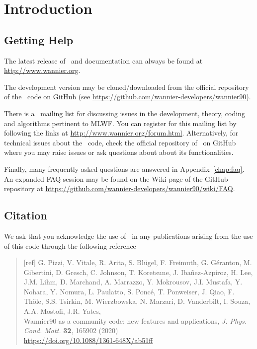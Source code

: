 \chapter*{Introduction}
\section*{Getting Help}
The latest release of \wannier\ and documentation can always
be found at \url{http://www.wannier.org}.

The development version may be cloned/downloaded from the
official repository of the \wannier\ code on GitHub 
(see \url{https://github.com/wannier-developers/wannier90}).

There is a \wannier\ mailing list for discussing issues in the
development, theory, coding and algorithms pertinent to MLWF.
You can register for this mailing list by following the links at
\url{http://www.wannier.org/forum.html}.
Alternatively, for technical issues about the \wannier\ code, 
check the official repository of \wannier\ on GitHub 
where you may raise issues or ask questions about about its
functionalities.

Finally, many frequently asked questions are answered in
Appendix~\ref{chap:faq}. An expanded FAQ session may be
found on the Wiki page of the GitHub repository at 
\url{https://github.com/wannier-developers/wannier90/wiki/FAQ}. 

\section*{Citation}
We ask that you acknowledge the use of \wannier\ in any publications
arising from the use of this code through the following reference
\begin{quote}
  [ref] G. Pizzi, V. Vitale, R. Arita, S. Bl\"ugel, F. Freimuth, G. G\'eranton, 
  M. Gibertini, D. Gresch, C. Johnson, T. Koretsune, J. Iba\~nez-Azpiroz, 
  H. Lee, J.M. Lihm, D. Marchand, A. Marrazzo, Y. Mokrousov, J.I. Mustafa, 
  Y. Nohara, Y. Nomura, L. Paulatto, S. Ponc\'e, T. Ponweiser, J. Qiao, 
  F. Th\"ole, S.S. Tsirkin, M. Wierzbowska, N. Marzari, D. Vanderbilt, 
  I. Souza, A.A. Mostofi, J.R. Yates,\\
  Wannier90 as a community code: new features and 
    applications, \emph{J. Phys. Cond. Matt.} {\bf 32}, 165902 (2020)\\
    \url{https://doi.org/10.1088/1361-648X/ab51ff}
  \end{quote}
  
